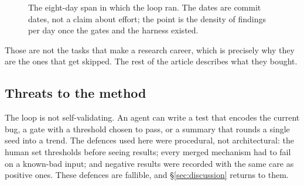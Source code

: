 \begin{figure}[htbp]
\centering
{}
\caption{The eight-day span in which the loop ran. The dates are commit dates, not a
claim about effort; the point is the density of findings per day once the gates
and the harness existed.}
\label{fig:timeline}
\end{figure}
Those are not the tasks that make a research career, which is precisely why
they are the ones that get skipped. The rest of the article describes what they
bought.

\subsection{Threats to the method}
\label{sec:method-threats}

The loop is not self-validating. An agent can write a test that encodes the
current bug, a gate with a threshold chosen to pass, or a summary that rounds a
single seed into a trend. The defences used here were procedural, not
architectural: the human set thresholds before seeing results; every merged
mechanism had to fail on a known-bad input; and negative results were recorded
with the same care as positive ones. These defences are fallible, and
\S\ref{sec:discussion} returns to them.
